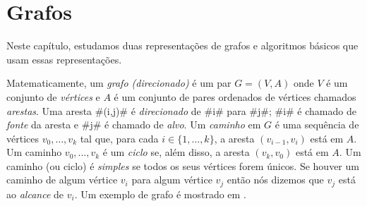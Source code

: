 \chapter{Grafos}


Neste capítulo, estudamos duas representações de grafos e algoritmos básicos que usam essas representações.  

Matematicamente, um \emph{grafo (direcionado)}
%
%
é um par $G=(V,A)$ onde
$V$ é um  conjunto de \emph{vértices}
%
e $A$ é um conjunto de pares ordenados
de vértices chamados \emph{arestas}.
%
Uma aresta #(i,j)# é \emph{direcionado}
%
de #i# para #j#;  #i# é chamado de \emph{fonte}
 da aresta e #j#
é chamado de \emph{alvo}.
  Um \emph{caminho}%
 em $G$ é uma sequência de
vértices $v_0,\ldots,v_k$ tal que, para cada $i\in\{1,\ldots,k\}$,
a aresta $(v_{i-1},v_{i})$ está em $A$.  Um caminho $v_0,\ldots,v_k$ é um
\emph{ciclo}
%
se, além disso, a aresta $(v_k,v_0)$ está em $A$.  Um caminho (ou
ciclo) é \emph{simples}
%
se todos os seus vértices forem únicos.  Se houver um caminho de 
algum vértice $v_i$ para algum vértice $v_j$ então nós dizemos que
$v_j$ está ao \emph{alcance}
 de $v_i$.  Um exemplo de grafo é mostrado 
em .

